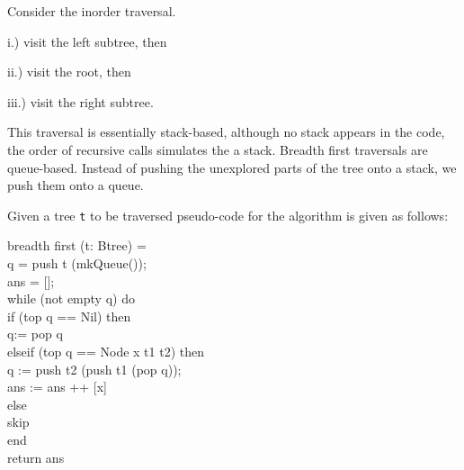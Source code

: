 \documentclass[11pt]{article}
\begin{document}




\goodbreak\noindent{} Consider the inorder traversal.

\goodbreak{}
\begin{description}
\item{i.)} visit the left subtree, then
\item{ii.)}  visit the root, then
\item{iii.)} visit the right subtree.
\end{description}


This traversal is essentially stack-based, although no stack appears
in the code, the order of recursive calls simulates the a stack.
Breadth first traversals are queue-based. Instead of pushing the
unexplored parts of the tree onto a stack, we push them onto a queue.

\goodbreak\noindent{}Given a  tree {\tt{t}} to be traversed pseudo-code for the algorithm is given as follows:
\goodbreak{}
\begin{program*}
\> breadth first (t: Btree) =            \\
\>   q = push t (mkQueue());           \\
\>   ans = [];           \\
\>   while (not empty q) do            \\
\>       if (top q == Nil) then            \\
\>           q:= pop q           \\
\>       elseif (top q == Node x t1 t2) then            \\
\>           q := push t2 (push t1 (pop q));           \\
\>           ans := ans ++ [x]           \\
\>       else           \\
\>           skip           \\
\>   end \\
\>   return ans\\
\end{program*}
\end{document}
